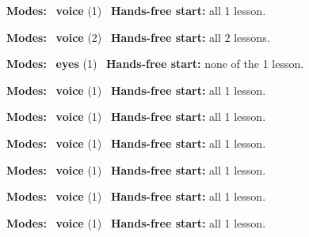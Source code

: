 \expandafter\def\csname hlchaptermodality87\endcsname{%
  {\small\noindent
    \textbf{Modes:} \hlvoicesign{}~\textbf{voice} (1)\quad
    \hlvoicesign{}~\textbf{Hands-free start:} all 1 lesson.%
    \par}\medskip
}

\expandafter\def\csname hlchaptermodality88\endcsname{%
  {\small\noindent
    \textbf{Modes:} \hlvoicesign{}~\textbf{voice} (2)\quad
    \hlvoicesign{}~\textbf{Hands-free start:} all 2 lessons.%
    \par}\medskip
}

\expandafter\def\csname hlchaptermodality89\endcsname{%
  {\small\noindent
    \textbf{Modes:} \hlsightsign{}~\textbf{eyes} (1)\quad
    \hlvoicesign{}~\textbf{Hands-free start:} none of the 1 lesson.%
    \par}\medskip
}

\expandafter\def\csname hlchaptermodality90\endcsname{%
  {\small\noindent
    \textbf{Modes:} \hlvoicesign{}~\textbf{voice} (1)\quad
    \hlvoicesign{}~\textbf{Hands-free start:} all 1 lesson.%
    \par}\medskip
}

\expandafter\def\csname hlchaptermodality91\endcsname{%
  {\small\noindent
    \textbf{Modes:} \hlvoicesign{}~\textbf{voice} (1)\quad
    \hlvoicesign{}~\textbf{Hands-free start:} all 1 lesson.%
    \par}\medskip
}

\expandafter\def\csname hlchaptermodality92\endcsname{%
  {\small\noindent
    \textbf{Modes:} \hlvoicesign{}~\textbf{voice} (1)\quad
    \hlvoicesign{}~\textbf{Hands-free start:} all 1 lesson.%
    \par}\medskip
}

\expandafter\def\csname hlchaptermodality93\endcsname{%
  {\small\noindent
    \textbf{Modes:} \hlvoicesign{}~\textbf{voice} (1)\quad
    \hlvoicesign{}~\textbf{Hands-free start:} all 1 lesson.%
    \par}\medskip
}

\expandafter\def\csname hlchaptermodality94\endcsname{%
  {\small\noindent
    \textbf{Modes:} \hlvoicesign{}~\textbf{voice} (1)\quad
    \hlvoicesign{}~\textbf{Hands-free start:} all 1 lesson.%
    \par}\medskip
}

\expandafter\def\csname hlchaptermodality95\endcsname{%
  {\small\noindent
    \textbf{Modes:} \hlvoicesign{}~\textbf{voice} (1)\quad
    \hlvoicesign{}~\textbf{Hands-free start:} all 1 lesson.%
    \par}\medskip
}

